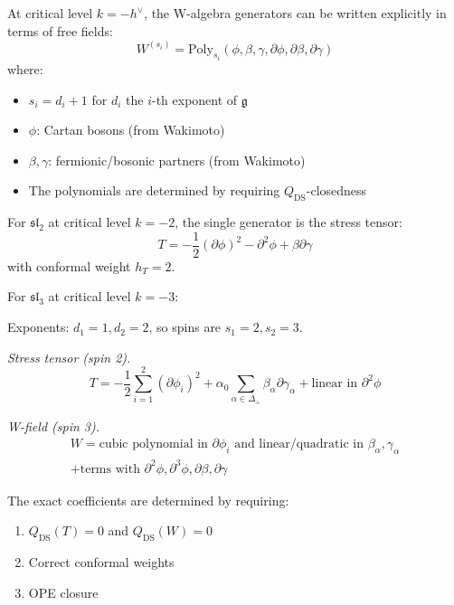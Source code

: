 \begin{theorem}\label{thm:generators-screening}
At critical level $k = -h^\vee$, the W-algebra generators can be written explicitly in terms of free fields:
\begin{equation}
W^{(s_i)} = \text{Poly}_{s_i}(\phi, \beta, \gamma, \partial\phi, \partial\beta, \partial\gamma)
\end{equation}
where:
\begin{itemize}
\item $s_i = d_i + 1$ for $d_i$ the $i$-th exponent of $\mathfrak{g}$
\item $\phi$: Cartan bosons (from Wakimoto)
\item $\beta, \gamma$: fermionic/bosonic partners (from Wakimoto)
\item The polynomials are determined by requiring $Q_{\text{DS}}$-closedness
\end{itemize}
\end{theorem}

\begin{example}
For $\mathfrak{sl}_2$ at critical level $k = -2$, the single generator is the stress tensor:
\begin{equation}
T = -\frac{1}{2}(\partial \phi)^2 - \partial^2 \phi + \beta \partial \gamma
\end{equation}
with conformal weight $h_T = 2$.
\end{example}

\begin{example}
For $\mathfrak{sl}_3$ at critical level $k = -3$:

Exponents: $d_1 = 1, d_2 = 2$, so spins are $s_1 = 2, s_2 = 3$.

\emph{Stress tensor (spin 2).}
\begin{equation}
T = -\frac{1}{2} \sum_{i=1}^2 (\partial \phi_i)^2 + \alpha_0 \sum_{\alpha \in \Delta_+} \beta_\alpha \partial \gamma_\alpha + \text{linear in } \partial^2\phi
\end{equation}

\emph{W-field (spin 3).}
\begin{multline}
W = \text{cubic polynomial in } \partial\phi_i \text{ and linear/quadratic in } \beta_\alpha, \gamma_\alpha \\
+ \text{terms with } \partial^2\phi, \partial^3\phi, \partial\beta, \partial\gamma
\end{multline}

The exact coefficients are determined by requiring:
\begin{enumerate}
\item $Q_{\text{DS}}(T) = 0$ and $Q_{\text{DS}}(W) = 0$
\item Correct conformal weights
\item OPE closure
\end{enumerate}
\end{example}

